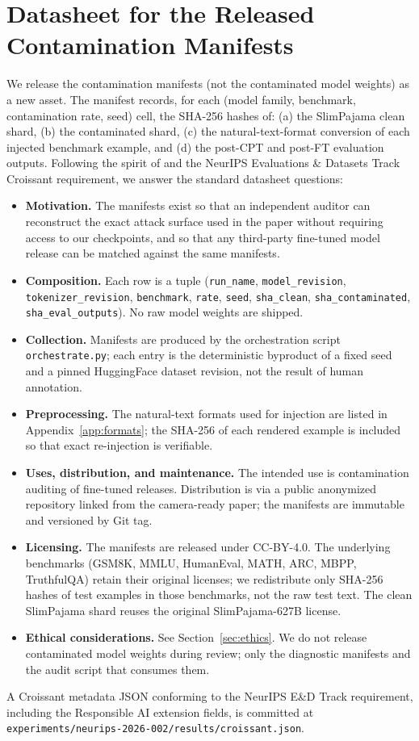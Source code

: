 \documentclass{article}
\begin{document}
\section{Datasheet for the Released Contamination Manifests}
\label{app:datasheet}
We release the contamination manifests (not the contaminated model weights) as a new asset. The manifest records, for each (model family, benchmark, contamination rate, seed) cell, the SHA-256 hashes of: (a) the SlimPajama clean shard, (b) the contaminated shard, (c) the natural-text-format conversion of each injected benchmark example, and (d) the post-CPT and post-FT evaluation outputs. Following the spirit of \citet{gebru2021datasheets} and the NeurIPS Evaluations \& Datasets Track Croissant requirement, we answer the standard datasheet questions:
\begin{itemize}[leftmargin=*,nosep]
  \item \textbf{Motivation.} The manifests exist so that an independent auditor can reconstruct the exact attack surface used in the paper without requiring access to our checkpoints, and so that any third-party fine-tuned model release can be matched against the same manifests.
  \item \textbf{Composition.} Each row is a tuple (\texttt{run\_name}, \texttt{model\_revision}, \texttt{tokenizer\_revision}, \texttt{benchmark}, \texttt{rate}, \texttt{seed}, \texttt{sha\_clean}, \texttt{sha\_contaminated}, \texttt{sha\_eval\_outputs}). No raw model weights are shipped.
  \item \textbf{Collection.} Manifests are produced by the orchestration script \texttt{orchestrate.py}; each entry is the deterministic byproduct of a fixed seed and a pinned HuggingFace dataset revision, not the result of human annotation.
  \item \textbf{Preprocessing.} The natural-text formats used for injection are listed in Appendix~\ref{app:formats}; the SHA-256 of each rendered example is included so that exact re-injection is verifiable.
  \item \textbf{Uses, distribution, and maintenance.} The intended use is contamination auditing of fine-tuned releases. Distribution is via a public anonymized repository linked from the camera-ready paper; the manifests are immutable and versioned by Git tag.
  \item \textbf{Licensing.} The manifests are released under CC-BY-4.0. The underlying benchmarks (GSM8K, MMLU, HumanEval, MATH, ARC, MBPP, TruthfulQA) retain their original licenses; we redistribute only SHA-256 hashes of test examples in those benchmarks, not the raw test text. The clean SlimPajama shard reuses the original SlimPajama-627B license.
  \item \textbf{Ethical considerations.} See Section~\ref{sec:ethics}. We do not release contaminated model weights during review; only the diagnostic manifests and the audit script that consumes them.
\end{itemize}
A Croissant metadata JSON conforming to the NeurIPS E\&D Track requirement, including the Responsible AI extension fields, is committed at \texttt{experiments/neurips-2026-002/results/croissant.json}.


\end{document}
